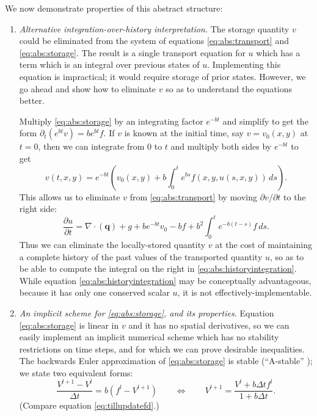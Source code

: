 \documentclass[11pt,final]{amsart}
\newcommand{\Div}{\nabla\cdot}
\begin{document}
We now demonstrate properties of this abstract structure:

\renewcommand{\labelenumi}{\arabic{enumi}.\quad}

\begin{enumerate}
\item  \emph{Alternative integration-over-history interpretation.}  The storage quantity $v$ could be eliminated from the system of equations \eqref{eq:abs:transport} and \eqref{eq:abs:storage}.  The result is a single transport equation for $u$ which has a term which is an integral over previous states of $u$.  Implementing this equation is impractical; it would require storage of prior states.  However, we go ahead and show how to eliminate $v$ so as to understand the equations better.  

Multiply \eqref{eq:abs:storage} by an integrating factor $e^{-bt}$ and simplify to get the form $\partial_t (e^{bt} v) = b e^{bt} f$.  If $v$ is known at the initial time, say $v=v_0(x,y)$ at $t=0$, then we can integrate from $0$ to $t$ and multiply both sides by $e^{-bt}$ to get
\begin{equation}
v(t,x,y) = e^{-bt} \left(v_0(x,y) + b \int_0^t e^{bs} f(x,y,u(s,x,y))\,ds\right). \label{eq:abs:vexpression}
\end{equation}
This allows us to eliminate $v$ from \eqref{eq:abs:transport} by moving $\partial v/\partial t$ to the right side:
\begin{equation}
\frac{\partial u}{\partial t} = \Div \left(\mathbf{q}\right) + g + b e^{-bt} v_0 - b f + b^2 \int_0^t e^{-b(t-s)} f\,ds. \label{eq:abs:historyintegration} 
\end{equation}
Thus we can eliminate the locally-stored quantity $v$ at the cost of maintaining a complete history of the past values of the transported quantity $u$, so as to be able to compute the integral on the right in \eqref{eq:abs:historyintegration}.  While equation \eqref{eq:abs:historyintegration} may be conceptually advantageous, because it has only one conserved scalar $u$, it is not effectively-implementable.
\medskip

\item \emph{An implicit scheme for \eqref{eq:abs:storage}, and its properties.}  Equation \eqref{eq:abs:storage} is linear in $v$ and it has no spatial derivatives, so we can easily implement an implicit numerical scheme which has no stability restrictions on time steps, and for which we can prove desirable inequalities.  The backwards Euler approximation of \eqref{eq:abs:storage} is stable (``A-stable'' \citep{AscherPetzold}); we state two equivalent forms:
\begin{equation}
\frac{V^{l+1} - V^l}{\Delta t} = b \left(f^l - V^{l+1}\right) \qquad \iff \qquad
V^{l+1} = \frac{V^l + b \Delta t f^l}{1 + b \Delta t}.  \label{eq:abs:Vupdate}
\end{equation}
(Compare equation \eqref{eq:tillupdatefd}.)


\end{enumerate}
\end{document}
